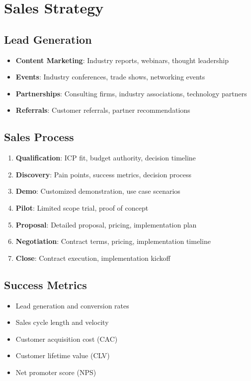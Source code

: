\documentclass[business]{../templates/infraradar-main}
\begin{document}
\section{Sales Strategy}

\subsection{Lead Generation}
\begin{itemize}
    \item \textbf{Content Marketing}: Industry reports, webinars, thought leadership
    \item \textbf{Events}: Industry conferences, trade shows, networking events
    \item \textbf{Partnerships}: Consulting firms, industry associations, technology partners
    \item \textbf{Referrals}: Customer referrals, partner recommendations
\end{itemize}

\subsection{Sales Process}
\begin{enumerate}
    \item \textbf{Qualification}: ICP fit, budget authority, decision timeline
    \item \textbf{Discovery}: Pain points, success metrics, decision process
    \item \textbf{Demo}: Customized demonstration, use case scenarios
    \item \textbf{Pilot}: Limited scope trial, proof of concept
    \item \textbf{Proposal}: Detailed proposal, pricing, implementation plan
    \item \textbf{Negotiation}: Contract terms, pricing, implementation timeline
    \item \textbf{Close}: Contract execution, implementation kickoff
\end{enumerate}

\subsection{Success Metrics}
\begin{itemize}
    \item Lead generation and conversion rates
    \item Sales cycle length and velocity
    \item Customer acquisition cost (CAC)
    \item Customer lifetime value (CLV)
    \item Net promoter score (NPS)
\end{itemize}
\end{document}
